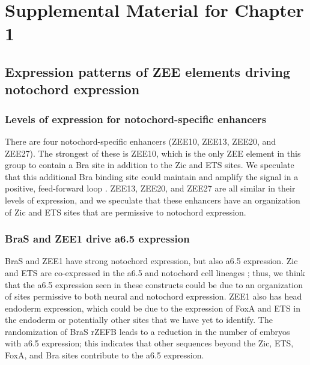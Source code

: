 \appendix{}
\chapter{Supplemental Material for Chapter 1}

\section{Expression patterns of ZEE elements driving notochord expression}

\subsection{Levels of expression for notochord-specific enhancers}
There are four notochord-specific enhancers (ZEE10, ZEE13, ZEE20, and ZEE27). The strongest of these is ZEE10, which is the only ZEE element in this group to contain a Bra site in addition to the Zic and ETS sites. We speculate that this additional Bra binding site could maintain and amplify the signal in a positive, feed-forward loop \cite{reeves2017}. ZEE13, ZEE20, and ZEE27 are all similar in their levels of expression, and we speculate that these enhancers have an organization of Zic and ETS sites that are permissive to notochord expression. 

\subsection{BraS and ZEE1 drive a6.5 expression}
BraS and ZEE1 have strong notochord expression, but also a6.5 expression. Zic and ETS are co-expressed in the a6.5 and notochord cell lineages \cite{matsumoto2007a}; thus, we think that the a6.5 expression seen in these constructs could be due to an organization of sites permissive to both neural and notochord expression. ZEE1 also has head endoderm expression, which could be due to the expression of FoxA and ETS in the endoderm or potentially other sites that we have yet to identify. The randomization of BraS rZEFB leads to a reduction in the number of embryos with a6.5 expression; this indicates that other sequences beyond the Zic, ETS, FoxA, and Bra sites contribute to the a6.5 expression. 

